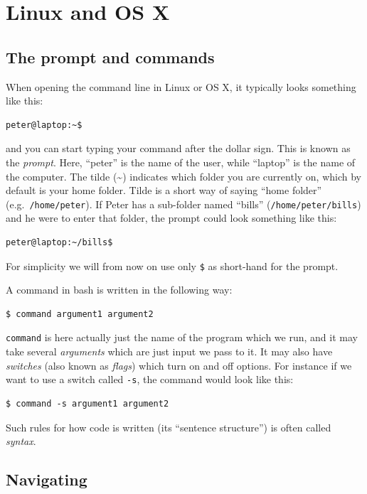 \section{Linux and OS X}

\subsection{The prompt and commands}
When opening the command line in Linux or OS X, it typically looks something like this:
\begin{verbatim}
peter@laptop:~$
\end{verbatim}
and you can start typing your command after the dollar sign. This is known as the \emph{prompt}. Here, ``peter'' is the name of the user, while ``laptop'' is the name of the computer. The tilde (\~{}) indicates which folder you are currently on, which by default is your home folder. Tilde is a short way of saying ``home folder'' (e.g.\ \verb|/home/peter|). If Peter has a sub-folder named ``bills'' (\verb|/home/peter/bills|) and he were to enter that folder, the prompt could look something like this:
\begin{verbatim}
peter@laptop:~/bills$
\end{verbatim}
For simplicity we will from now on use only \texttt{\$} as short-hand for the prompt.

A command in bash is written in the following way:

\begin{verbatim}
$ command argument1 argument2
\end{verbatim}

\verb|command| is here actually just the name of the program which we run, and it may take several \emph{arguments} which are just input we pass to it. It may also have \emph{switches} (also known as \emph{flags}) which turn on and off options. For instance if we want to use a switch called \verb|-s|, the command would look like this:

\begin{verbatim}
$ command -s argument1 argument2
\end{verbatim}
Such rules for how code is written (its ``sentence structure'') is often called \emph{syntax}. 

\subsection{Navigating}
